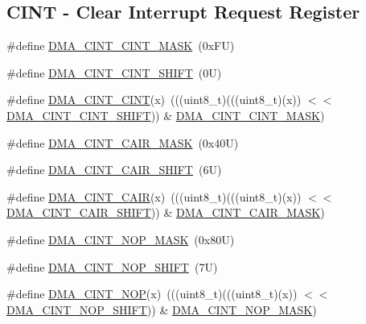 \subsection*{C\+I\+NT -\/ Clear Interrupt Request Register}
\begin{DoxyCompactItemize}
\item 
\#define \mbox{\hyperlink{group___d_m_a___register___masks_ga1edbbba2f0260e0467e0a43e04eaaa1d}{D\+M\+A\+\_\+\+C\+I\+N\+T\+\_\+\+C\+I\+N\+T\+\_\+\+M\+A\+SK}}~(0x\+F\+U)
\item 
\#define \mbox{\hyperlink{group___d_m_a___register___masks_ga5fd76123ada3ca8b762c83b344994a78}{D\+M\+A\+\_\+\+C\+I\+N\+T\+\_\+\+C\+I\+N\+T\+\_\+\+S\+H\+I\+FT}}~(0\+U)
\item 
\#define \mbox{\hyperlink{group___d_m_a___register___masks_ga2aba228e6eca0c2db8b375c15b38cdcb}{D\+M\+A\+\_\+\+C\+I\+N\+T\+\_\+\+C\+I\+NT}}(x)~(((uint8\+\_\+t)(((uint8\+\_\+t)(x)) $<$$<$ \mbox{\hyperlink{group___d_m_a___register___masks_ga5fd76123ada3ca8b762c83b344994a78}{D\+M\+A\+\_\+\+C\+I\+N\+T\+\_\+\+C\+I\+N\+T\+\_\+\+S\+H\+I\+FT}})) \& \mbox{\hyperlink{group___d_m_a___register___masks_ga1edbbba2f0260e0467e0a43e04eaaa1d}{D\+M\+A\+\_\+\+C\+I\+N\+T\+\_\+\+C\+I\+N\+T\+\_\+\+M\+A\+SK}})
\item 
\#define \mbox{\hyperlink{group___d_m_a___register___masks_gad5b3c0206e0a7af209d0e9e5e68d2526}{D\+M\+A\+\_\+\+C\+I\+N\+T\+\_\+\+C\+A\+I\+R\+\_\+\+M\+A\+SK}}~(0x40\+U)
\item 
\#define \mbox{\hyperlink{group___d_m_a___register___masks_gaf7dd4a94c052317c29e7bd1bcb82532d}{D\+M\+A\+\_\+\+C\+I\+N\+T\+\_\+\+C\+A\+I\+R\+\_\+\+S\+H\+I\+FT}}~(6\+U)
\item 
\#define \mbox{\hyperlink{group___d_m_a___register___masks_ga48036f8fba089c6b2d46fdd83c792ba5}{D\+M\+A\+\_\+\+C\+I\+N\+T\+\_\+\+C\+A\+IR}}(x)~(((uint8\+\_\+t)(((uint8\+\_\+t)(x)) $<$$<$ \mbox{\hyperlink{group___d_m_a___register___masks_gaf7dd4a94c052317c29e7bd1bcb82532d}{D\+M\+A\+\_\+\+C\+I\+N\+T\+\_\+\+C\+A\+I\+R\+\_\+\+S\+H\+I\+FT}})) \& \mbox{\hyperlink{group___d_m_a___register___masks_gad5b3c0206e0a7af209d0e9e5e68d2526}{D\+M\+A\+\_\+\+C\+I\+N\+T\+\_\+\+C\+A\+I\+R\+\_\+\+M\+A\+SK}})
\item 
\#define \mbox{\hyperlink{group___d_m_a___register___masks_ga46266d0d4343c952af65db101c5c9a61}{D\+M\+A\+\_\+\+C\+I\+N\+T\+\_\+\+N\+O\+P\+\_\+\+M\+A\+SK}}~(0x80\+U)
\item 
\#define \mbox{\hyperlink{group___d_m_a___register___masks_ga96d721360be562b2a0cf04acf72ebcf9}{D\+M\+A\+\_\+\+C\+I\+N\+T\+\_\+\+N\+O\+P\+\_\+\+S\+H\+I\+FT}}~(7\+U)
\item 
\#define \mbox{\hyperlink{group___d_m_a___register___masks_ga77294056288dccb5a54e7fb1a3ac984d}{D\+M\+A\+\_\+\+C\+I\+N\+T\+\_\+\+N\+OP}}(x)~(((uint8\+\_\+t)(((uint8\+\_\+t)(x)) $<$$<$ \mbox{\hyperlink{group___d_m_a___register___masks_ga96d721360be562b2a0cf04acf72ebcf9}{D\+M\+A\+\_\+\+C\+I\+N\+T\+\_\+\+N\+O\+P\+\_\+\+S\+H\+I\+FT}})) \& \mbox{\hyperlink{group___d_m_a___register___masks_ga46266d0d4343c952af65db101c5c9a61}{D\+M\+A\+\_\+\+C\+I\+N\+T\+\_\+\+N\+O\+P\+\_\+\+M\+A\+SK}})
\end{DoxyCompactItemize}
